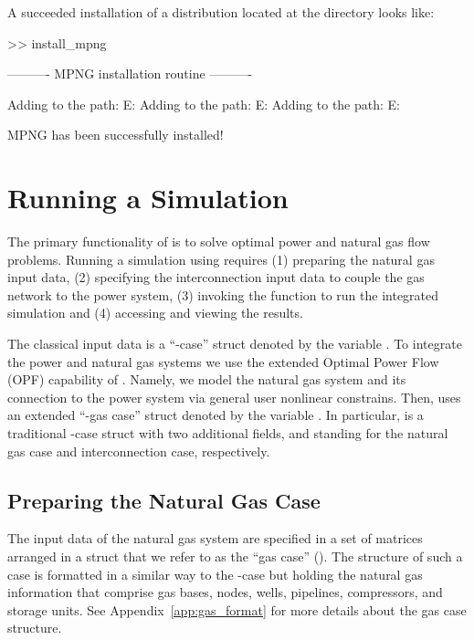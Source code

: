 \noindent A succeeded installation of a distribution located at the directory \mpnggitpath{} looks like:

\begin{Notice}
>> install_mpng

---------- MPNG installation routine ---------- 

Adding to the path: E:\GITHUB\MPNG\Functions
Adding to the path: E:\GITHUB\MPNG\Cases
Adding to the path: E:\GITHUB\MPNG\Examples

MPNG has been successfully installed!	
\end{Notice} 

\section{Running a Simulation}
\label{sec:simulate}

The primary functionality of \mpng{} is to solve optimal power and natural gas flow problems. Running a simulation using \mpng{} requires (1) preparing the natural gas input data, (2) specifying the interconnection input data to couple the gas network to the power system, (3) invoking the function to run the integrated simulation and (4) accessing and viewing the results.

The classical \matpower{} input data is a ``\matpower{}-case'' struct denoted by the variable \cite{matpower_manual}. To integrate the power and natural gas systems we use the extended Optimal Power Flow (OPF) capability of \matpower{}. Namely, we model the natural gas system and its connection to the power system via general user nonlinear constrains. Then, \mpng{} uses an extended ``\matpower{}-gas case'' struct denoted by the variable . In particular,  is a traditional \matpower{}-case struct with two additional fields,  and  standing for the natural gas case and interconnection case, respectively.

\subsection{Preparing the Natural Gas Case}
\label{subsec:gas_case}

The input data of the natural gas system are specified in a set of matrices arranged in a \matlab{} struct that we refer to as the ``gas case'' (). The structure of such a case is formatted in a similar way to the \matpower{}-case but holding the natural gas information that comprise gas bases, nodes, wells, pipelines, compressors, and storage units. See Appendix~\ref{app:gas_format} for more details about the gas case structure.

